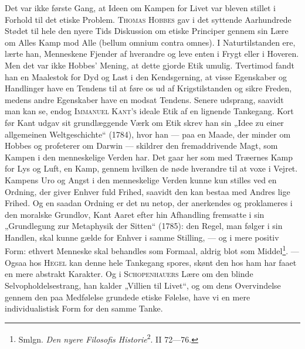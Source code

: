 \documentclass[12pt,a4paper,openany]{book}
\newcommand{\opage}[1]{\marginnote{\footnotesize\textit{[#1]}}}
\begin{document}
Det var ikke første Gang, at Ideen om Kampen for Livet
var bleven stillet i Forhold til det etiske Problem. \textsc{Thomas
Hobbes} gav i det syttende Aarhundrede Stødet til hele den
nyere Tids Diskussion om etiske Principer gennem sin Lære
om Alles Kamp mod Alle (bellum omnium contra omnes). I
Naturtilstanden ere, lærte han, Menneskene Fjender af hverandre
og leve enten i Frygt eller i Hoveren. Men det var
ikke Hobbes’ Mening, at dette gjorde Etik umulig. Tvertimod
fandt han en Maalestok for Dyd og Last i den Kendsgerning,
at visse Egenskaber og Handlinger have en Tendens til at føre
os ud af Krigstilstanden og sikre Freden, medens andre Egenskaber
have en modsat Tendens. Senere udsprang, saavidt
\setcounter{footnote}{0}%
\opage{221}man kan se, endog \textsc{Immanuel Kant’s} ideale Etik af en lignende
Tankegang. Kort før Kant udgav sit grundlæggende
Værk om Etik skrev han sin „Idee zu einer allgemeinen Weltgeschichte“
(1784), hvor han --- paa en Maade, der minder
om Hobbes og profeterer om Darwin --- skildrer den fremaddrivende
Magt, som Kampen i den menneskelige Verden har.
Det gaar her som med Træernes Kamp for Lys og Luft, en
Kamp, gennem hvilken de nøde hverandre til at voxe i Vejret.
Kampens Uro og Angst i den menneskelige Verden kunne kun
stilles ved en Ordning, der giver Enhver fuld Frihed, saavidt
den kan bestaa med Andres lige Frihed. Og en saadan Ordning
er det nu netop, der anerkendes og proklameres i den
moralske Grundlov, Kant Aaret efter hin Afhandling fremsatte
i sin „Grundlegung zur Metaphysik der Sitten“ (1785): den
Regel, man følger i sin Handlen, skal kunne gælde for Enhver
i samme Stilling, --- og i mere positiv Form: ethvert Menneske
skal behandles som Formaal, aldrig blot som Middel\footnote[1]{Smlgn. \textit{Den nyere Filosofis Historie}\textsuperscript{2}. II 72---76.}. --- Ogsaa
hos \textsc{Hegel} kan denne hele Tankegang spores, skønt den
hos ham har faaet en mere abstrakt Karakter. Og i \textsc{Schopenhauers}
Lære om den blinde Selvopholdelsestrang, han kalder
„Villien til Livet“, og om dens Overvindelse gennem den paa
Medfølelse grundede etiske Følelse, have vi en mere individualistisk
Form for den samme Tanke.
\end{document}
